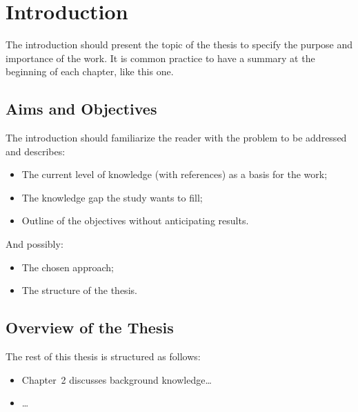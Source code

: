 \chapter{Introduction}

The introduction should present the topic of the thesis to specify the purpose and importance of the work. It is common practice to have a summary at the beginning of each chapter, like this one.

\section{Aims and Objectives}

The introduction should familiarize the reader with the problem to be addressed and describes:
\begin{itemize}
    \item The current level of knowledge (with references) as a basis for the work;
    \item The knowledge gap the study wants to fill;
    \item Outline of the objectives without anticipating results.
\end{itemize}
And possibly:
\begin{itemize}
	\item The chosen approach;
	\item The structure of the thesis.
\end{itemize}

\section{Overview of the Thesis}

The rest of this thesis is structured as follows: 
\begin{itemize}
    \item Chapter~2 discusses background knowledge\ldots
    \item \ldots
\end{itemize}
